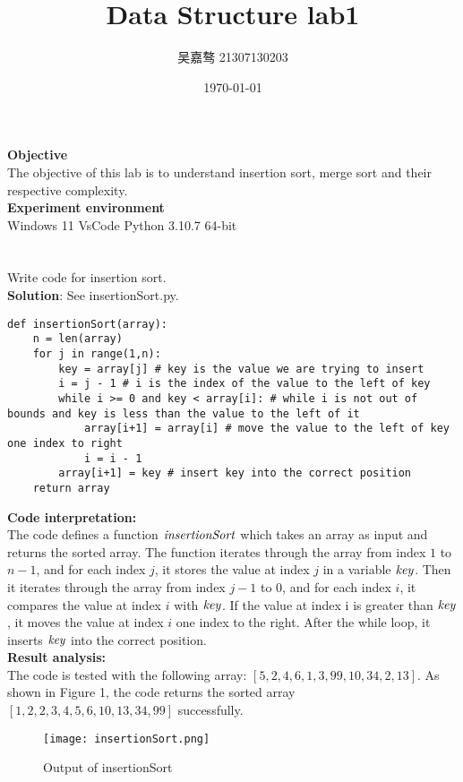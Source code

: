 \documentclass[UTF8]{ctexart}
\title{\textbf{Data Structure lab1}}
\author{吴嘉骜 21307130203}
\date{\today}
\begin{document}
\maketitle

\noindent
\textbf {Objective}\\  The objective of this lab is to understand insertion sort, merge sort and their respective complexity. \\
\noindent
\textbf {Experiment environment} \\
    Windows 11 VsCode Python 3.10.7 64-bit

\section{}
\setlength{\parindent}{0pt}
Write code for insertion sort. \\

\textbf{Solution}: See insertionSort.py.
\begin{lstlisting}
def insertionSort(array):
    n = len(array)
    for j in range(1,n):
        key = array[j] # key is the value we are trying to insert
        i = j - 1 # i is the index of the value to the left of key
        while i >= 0 and key < array[i]: # while i is not out of bounds and key is less than the value to the left of it
            array[i+1] = array[i] # move the value to the left of key one index to right
            i = i - 1
        array[i+1] = key # insert key into the correct position
    return array
\end{lstlisting}
\textbf{Code interpretation:} \\
The code defines a function $\it{insertionSort}$ which takes an array as input and returns the sorted array. 
The function iterates through the array from index $1$ to $n-1$, and for each index $j$, it stores the value at index $j$ in a variable $\it{key}$. 
Then it iterates through the array from index $j-1$ to $0$, and for each index $i$, it compares the value at index $i$ with $\it{key}$. 
If the value at index i is greater than $\it{key}$, it moves the value at index $i$ one index to the right. 
After the while loop, it inserts $\it{key}$ into the correct position. \\
\textbf{Result analysis:} \\
The code is tested with the following array: $[5, 2, 4, 6, 1, 3, 99, 10, 34, 2, 13]$. As shown in Figure 1, the code returns the sorted array $[1, 2, 2, 3, 4, 5, 6, 10, 13, 34, 99]$ successfully.
\begin{figure}[H]
    \centering
    \texttt{[image: insertionSort.png]}
    \caption{Output of insertionSort}
\end{figure}
\end{document}
